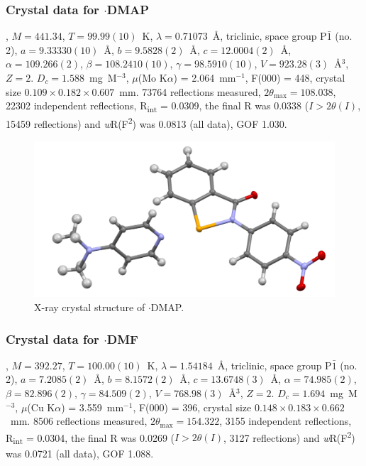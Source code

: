 \begin{refsection}
\subsubsection{Crystal data for \texorpdfstring{$ \cdot $DMAP}{C20 H18 N4 O3 Se}}
, $M=441.34$, $T=99.99(10)$~K, $ \lambda=0.71073 $~\AA, triclinic, space group P$\bar{1}$ (no. 2), $a = 9.33330(10)$~\AA, $b = 9.5828(2)$~\AA, $c = 12.0004(2)$~\AA, $\alpha = 109.266(2)$\degree, $\beta = 108.2410(10)$\degree, $\gamma = 98.5910(10)$\degree, $V = 923.28(3)$~\AA$^{3}$, $Z = 2$. $D_{c}= 1.588$~mg~M$^{-3}$, $\mu$(Mo K$\alpha$) = 2.064~mm$^{-1}$, F(000) = 448, crystal size $0.109 \times 0.182 \times 0.607$~mm. 73764 reflections measured, $2\theta_{\max}=108.038$\degree, 22302 independent reflections, R\textsubscript{int} = 0.0309, the final R was 0.0338 ($I > 2\theta(I)$, 15459 reflections) and \textit{w}R(F\textsuperscript{2}) was 0.0813 (all data), GOF 1.030.

\begin{figure}
  \includegraphics[width=0.6\linewidth]{Figures/ebs-4no2-dmap-xtal.pdf}
  \caption{X-ray crystal structure of \texorpdfstring{$ \cdot $DMAP}{C20 H18 N4 O3 Se}.}
\end{figure}

\subsubsection{Crystal data for \texorpdfstring{$ \cdot $DMF}{C16 H15 N3 O4 Se}}
, $M=392.27$, $T=100.00(10)$~K, $\lambda=1.54184$~\AA, triclinic, space group P$\bar{1}$ (no. 2), $a = 7.2085(2)$~\AA, $b = 8.1572(2)$~\AA, $c = 13.6748(3)$~\AA, $\alpha = 74.985(2)$\degree, $\beta = 82.896(2)$\degree, $\gamma = 84.509(2)$\degree, $V = 768.98(3)$~\AA$^{3}$, $Z = 2$. $D_{c}= 1.694$~mg~M$^{-3}$, $\mu$(Cu K$\alpha$) = 3.559~mm$^{-1}$, F(000) = 396, crystal size $0.148 \times 0.183 \times 0.662$~mm. 8506 reflections measured, $2\theta_{\max}=154.322$\degree, 3155 independent reflections, R\textsubscript{int} = 0.0304, the final R was 0.0269 ($I > 2\theta(I)$, 3127 reflections) and \textit{w}R(F\textsuperscript{2}) was 0.0721 (all data), GOF 1.088.


\end{refsection}
